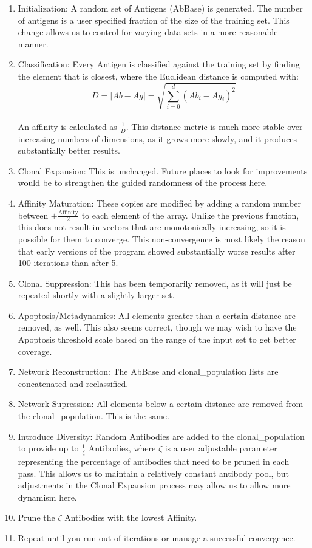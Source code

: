 \documentclass{article}
\theoremstyle{plain} %
\theoremstyle{remark}
\begin{document}
\begin{enumerate}
\item Initialization: A random set of Antigens (AbBase) is generated.
The number of antigens is a user specified fraction of the size of the
training set. This change allows us to control for varying data sets in
a more reasonable manner. 

\item Classification: Every Antigen is classified against the training
set by finding the element that is closest, where the Euclidean distance
is computed with: 
\[D = \left|Ab - Ag \right| = \sqrt{\sum_{i=0}^d (Ab_i - Ag_i)^2}\]\\
An affinity is calculated as $\frac{1}{D}$. This distance metric is much
more stable over increasing numbers of dimensions, as it grows more
slowly, and it produces substantially better results.
\item Clonal Expansion: This is unchanged. Future places to look for
improvements would be to strengthen the guided randomness of the process
here.
\item Affinity Maturation: These copies are modified by adding a random
number between $\pm\frac{\text{Affinity}}{2}$ to each element of the
array. Unlike the previous function, this does not result in vectors
that are monotonically increasing, so it is possible for them to
converge. This non-convergence is most likely the reason that early
versions of the program showed substantially worse results after 100
iterations than after 5.
\item Clonal Suppression: This has been temporarily removed, as it will
just be repeated shortly with a slightly larger set.
\item Apoptosis/Metadynamics: All elements greater than a certain
distance are removed, as well. This also seems correct, though we may
wish to have the Apoptosis threshold scale based on the range of the
input set to get better coverage.
\item Network Reconstruction: The AbBase and clonal\_population lists
are concatenated and reclassified.
\item Network Supression: All elements below a certain distance are
removed from the clonal\_population. This is the same. 
\item Introduce Diversity: Random Antibodies are added to the
clonal\_population to provide up to $\frac{1}{\zeta}$ Antibodies, where
$\zeta$ is a user adjustable parameter representing the percentage of
antibodies that need to be pruned in each pass. This allows us to
maintain a relatively constant antibody pool, but adjustments in the
Clonal Expansion process may allow us to allow more dynamism here.
\item Prune the $\zeta$ Antibodies with the lowest Affinity.
\item Repeat until you run out of iterations or manage a successful
convergence.
\end{enumerate}
\end{document}
